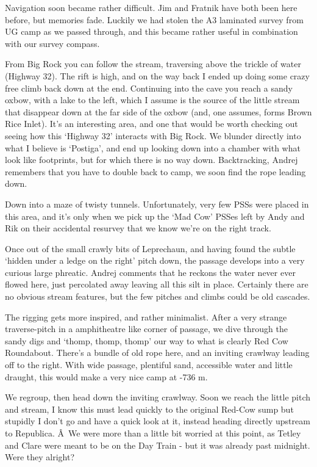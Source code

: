 Navigation soon became rather difficult. Jim and Fratnik have both been
here before, but memories fade. Luckily we had stolen the A3 laminated
survey from UG camp as we passed through, and this became rather useful
in combination with our survey compass.

From Big Rock you can follow the stream, traversing above the trickle of
water (Highway 32). The rift is high, and on the way back I ended up
doing some crazy free climb back down at the end. Continuing into the
cave you reach a sandy oxbow, with a lake to the left, which I assume is
the source of the little stream that disappear down at the far side of
the oxbow (and, one assumes, forms Brown Rice Inlet). It's an
interesting area, and one that would be worth checking out seeing how
this `Highway 32' interacts with Big Rock. We blunder directly into what
I believe is `Postiga', and end up looking down into a chamber with what
look like footprints, but for which there is no way down. Backtracking,
Andrej remembers that you have to double back to camp, we soon find the
rope leading down.

Down into a maze of twisty tunnels. Unfortunately, very few PSSs were
placed in this area, and it's only when we pick up the `Mad Cow' PSSes
left by Andy and Rik on their accidental resurvey that we know we're on
the right track.

Once out of the small crawly bits of Leprechaun, and having found the
subtle `hidden under a ledge on the right' pitch down, the passage
develops into a very curious large phreatic. Andrej comments that he
reckons the water never ever flowed here, just percolated away leaving
all this silt in place. Certainly there are no obvious stream features,
but the few pitches and climbs could be old cascades.

The rigging gets more inspired, and rather minimalist. After a very
strange traverse-pitch in a amphitheatre like corner of passage, we dive
through the sandy digs and `thomp, thomp, thomp' our way to what is
clearly Red Cow Roundabout. There's a bundle of old rope here, and an
inviting crawlway leading off to the right. With wide passage, plentiful
sand, accessible water and little draught, this would make a very nice
camp at -736 m.

We regroup, then head down the inviting crawlway. Soon we reach the
little pitch and stream, I know this must lead quickly to the original
Red-Cow sump but stupidly I don't go and have a quick look at it,
instead heading directly upstream to Republica. Â~We were more than a
little bit worried at this point, as Tetley and Clare were meant to be
on the Day Train - but it was already past midnight. Were they alright?

